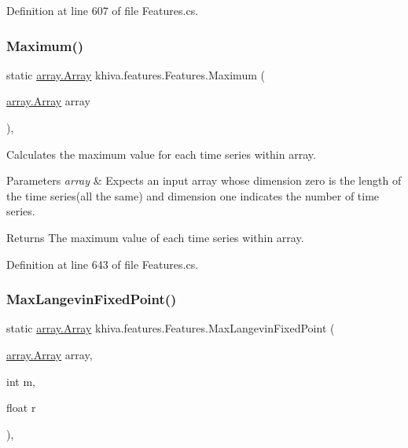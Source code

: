 Definition at line 607 of file Features.\+cs.

\mbox{\label{classkhiva_1_1features_1_1_features_acf9f8fa70526909d97eaafdfe3a2e446}} 
\subsubsection{\texorpdfstring{Maximum()}{Maximum()}}
{\footnotesize\ttfamily static \mbox{\hyperlink{classkhiva_1_1array_1_1_array}{array.\+Array}} khiva.\+features.\+Features.\+Maximum (\begin{DoxyParamCaption}\item[{\mbox{\hyperlink{classkhiva_1_1array_1_1_array}{array.\+Array}}}]{array }\end{DoxyParamCaption})\hspace{0.3cm}{\ttfamily [inline]}, {\ttfamily [static]}}



Calculates the maximum value for each time series within array. 


\begin{DoxyParams}{Parameters}
{\em array} & Expects an input array whose dimension zero is the length of the time series(all the same) and dimension one indicates the number of time series.\\
\hline
\end{DoxyParams}
\begin{DoxyReturn}{Returns}
The maximum value of each time series within array.
\end{DoxyReturn}


Definition at line 643 of file Features.\+cs.

\mbox{\label{classkhiva_1_1features_1_1_features_a173e9d29094ff881cbdae80cc61a2471}} 
\subsubsection{\texorpdfstring{Max\+Langevin\+Fixed\+Point()}{MaxLangevinFixedPoint()}}
{\footnotesize\ttfamily static \mbox{\hyperlink{classkhiva_1_1array_1_1_array}{array.\+Array}} khiva.\+features.\+Features.\+Max\+Langevin\+Fixed\+Point (\begin{DoxyParamCaption}\item[{\mbox{\hyperlink{classkhiva_1_1array_1_1_array}{array.\+Array}}}]{array,  }\item[{int}]{m,  }\item[{float}]{r }\end{DoxyParamCaption})\hspace{0.3cm}{\ttfamily [inline]}, {\ttfamily [static]}}



